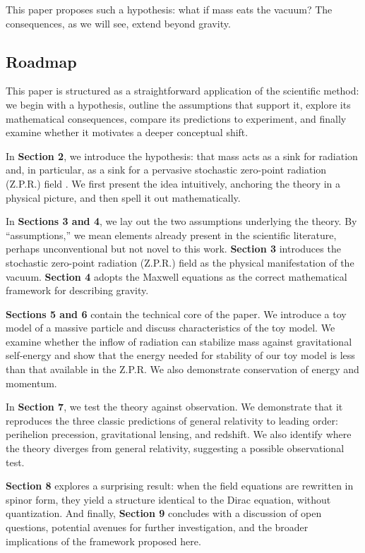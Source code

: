 \documentclass {article}
\begin{document}
This paper proposes such a hypothesis: what if mass eats the vacuum? The consequences, as we will see, extend beyond gravity.


\subsection{Roadmap}

This paper is structured as a straightforward application of the scientific method: we begin with a hypothesis, outline the assumptions that support it, explore its mathematical consequences, compare its predictions to experiment, and finally examine whether it motivates a deeper conceptual shift.

In \textbf{Section 2}, we introduce the hypothesis: that mass acts as a sink for radiation and, in particular, as a sink for a pervasive stochastic zero-point radiation (Z.P.R.) field . We first present the idea intuitively, anchoring the theory in a physical picture, and then spell it out mathematically.

In \textbf{Sections 3 and 4}, we lay out the two assumptions underlying the theory. By “assumptions,” we mean elements already present in the scientific literature, perhaps unconventional but not novel to this work. \textbf{Section 3} introduces the stochastic zero-point radiation (Z.P.R.) field as the physical manifestation of the vacuum. \textbf{Section 4} adopts the Maxwell equations as the correct mathematical framework for describing gravity. 

\textbf{Sections 5 and 6} contain the technical core of the paper. We introduce a toy model of a massive particle and discuss characteristics of the toy model. We examine whether the inflow of radiation can stabilize mass against gravitational self-energy and show that the energy needed for stability of our toy model is less than that available in the Z.P.R.  We also demonstrate conservation of energy and momentum.


In \textbf{Section 7}, we test the theory against observation. We demonstrate that it reproduces the three classic predictions of general relativity to leading order: perihelion precession, gravitational lensing, and redshift. We also identify where the theory diverges from general relativity, suggesting a possible observational test.

\textbf{Section 8} explores a surprising result: when the field equations are rewritten in spinor form, they yield a structure identical to the Dirac equation, without quantization. And finally, \textbf{Section 9} concludes with a discussion of open questions, potential avenues for further investigation, and the broader implications of the framework proposed here.
\end{document}
